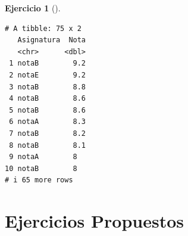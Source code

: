 \documentclass[
  a4paper,
]{scrreport}
\theoremstyle{definition}
\newtheorem{exercise}{Ejercicio}[chapter]
\theoremstyle{remark}
\begin{document}
\begin{exercise}[]
\begin{enumerate}
\begin{tcolorbox}
\begin{verbatim}
# A tibble: 75 x 2
   Asignatura  Nota
   <chr>      <dbl>
 1 notaB        9.2
 2 notaE        9.2
 3 notaB        8.8
 4 notaB        8.6
 5 notaB        8.6
 6 notaA        8.3
 7 notaB        8.2
 8 notaB        8.1
 9 notaA        8  
10 notaB        8  
# i 65 more rows
\end{verbatim}

  \end{tcolorbox}
\end{enumerate}

\end{exercise}

\section{Ejercicios Propuestos}\label{ejercicios-propuestos}
\end{document}
